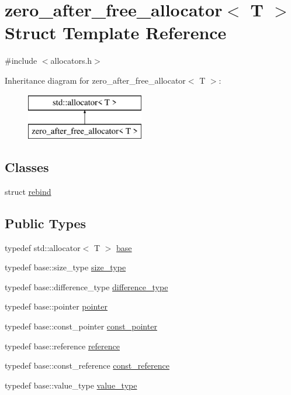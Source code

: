 \hypertarget{structzero__after__free__allocator}{}\section{zero\+\_\+after\+\_\+free\+\_\+allocator$<$ T $>$ Struct Template Reference}
\label{structzero__after__free__allocator}


{\ttfamily \#include $<$allocators.\+h$>$}

Inheritance diagram for zero\+\_\+after\+\_\+free\+\_\+allocator$<$ T $>$\+:\begin{figure}[H]
\begin{center}
\leavevmode
\includegraphics[height=2.000000cm]{structzero__after__free__allocator}
\end{center}
\end{figure}
\subsection*{Classes}
\begin{DoxyCompactItemize}
\item 
struct \hyperlink{structzero__after__free__allocator_1_1rebind}{rebind}
\end{DoxyCompactItemize}
\subsection*{Public Types}
\begin{DoxyCompactItemize}
\item 
typedef std\+::allocator$<$ T $>$ \hyperlink{structzero__after__free__allocator_aab907d58a45f5bf4baeaefb373f00987}{base}
\item 
typedef base\+::size\+\_\+type \hyperlink{structzero__after__free__allocator_a85f5f3250c0519ea82ff33d980e73994}{size\+\_\+type}
\item 
typedef base\+::difference\+\_\+type \hyperlink{structzero__after__free__allocator_ab45fc8fc90d403b3b44715616e167658}{difference\+\_\+type}
\item 
typedef base\+::pointer \hyperlink{structzero__after__free__allocator_a5cc395dbe16fe421abb6cdbcb96e06bd}{pointer}
\item 
typedef base\+::const\+\_\+pointer \hyperlink{structzero__after__free__allocator_a197fbd41cb35428c2ed27c23b742ec9b}{const\+\_\+pointer}
\item 
typedef base\+::reference \hyperlink{structzero__after__free__allocator_a27e208c4c218d79cf0df9b524c674ddb}{reference}
\item 
typedef base\+::const\+\_\+reference \hyperlink{structzero__after__free__allocator_ab9e83de52f17c19f263bef6ba258fbed}{const\+\_\+reference}
\item 
typedef base\+::value\+\_\+type \hyperlink{structzero__after__free__allocator_aebbf8f000c73198eec060af6734e1f91}{value\+\_\+type}
\end{DoxyCompactItemize}
